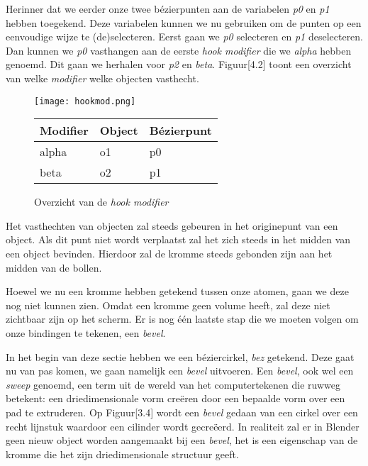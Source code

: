 

Herinner dat we eerder onze twee bézierpunten aan de variabelen \textit{p0} en \textit{p1} hebben toegekend. Deze variabelen kunnen we nu gebruiken om de punten op een eenvoudige wijze te (de)selecteren. Eerst gaan we \textit{p0} selecteren en \textit{p1} deselecteren. Dan kunnen we \textit{p0} vasthangen aan de eerste \textit{hook modifier} die we \textit{alpha} hebben genoemd. Dit gaan we herhalen voor \textit{p2} en \textit{beta}. Figuur[4.2] toont een overzicht van welke \textit{modifier} welke objecten vasthecht.  

\begin{figure}[h]
\texttt{[image: hookmod.png]}
\begin{tabular}{lll}
\hline
\multicolumn{1}{|l|}{Modifier} & \multicolumn{1}{l|}{Object} & \multicolumn{1}{l|}{Bézierpunt} \\ \hline
alpha                          & o1                          & p0                              \\
beta                           & o2                          & p1                             
\end{tabular}
\caption{Overzicht van de \textit{hook modifier}}
\end{figure}

Het vasthechten van objecten zal steeds gebeuren in het originepunt van een object. Als dit punt niet wordt verplaatst zal het zich steeds in het midden van een object bevinden. Hierdoor zal de kromme steeds gebonden zijn aan het midden van de bollen.
\par
Hoewel we nu een kromme hebben getekend tussen onze atomen, gaan we deze nog niet kunnen zien. Omdat een kromme geen volume heeft, zal deze niet zichtbaar zijn op het scherm. Er is nog één laatste stap die we moeten volgen om onze bindingen te tekenen, een \textit{bevel}.



In het begin van deze sectie hebben we een béziercirkel, \textit{bez} getekend. Deze gaat nu van pas komen, we gaan namelijk een \textit{bevel} uitvoeren. Een \textit{bevel}, ook wel een \textit{sweep} genoemd, een term uit de wereld van het computertekenen die ruwweg betekent: een driedimensionale vorm creëren door een bepaalde vorm over een pad te extruderen. Op Figuur[3.4] wordt een \textit{bevel} gedaan van een cirkel over een recht lijnstuk waardoor een cilinder wordt gecreëerd. In realiteit zal er in Blender geen nieuw object worden aangemaakt bij een \textit{bevel}, het is een eigenschap van de kromme die het zijn driedimensionale structuur geeft.  


